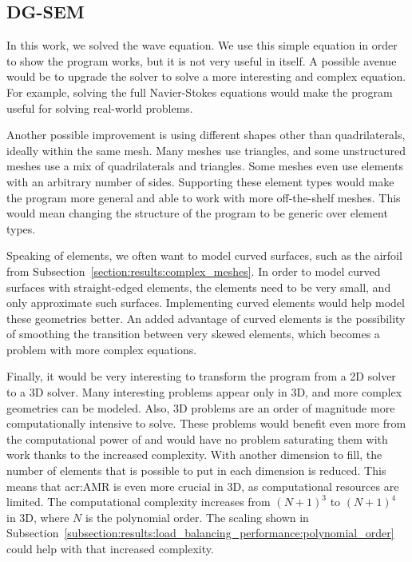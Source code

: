 \subsection{DG-SEM}\label{subsection:conclusion:future_work:dg_sem}

In this work, we solved the wave equation. We use this simple equation in order to show the program
works, but it is not very useful in itself. A possible avenue would be to upgrade the solver to
solve a more interesting and complex equation. For example, solving the full Navier-Stokes equations
would make the program useful for solving real-world problems.

Another possible improvement is using different shapes other than quadrilaterals, ideally within the
same mesh. Many meshes use triangles, and some unstructured meshes use a mix of quadrilaterals and
triangles. Some meshes even use elements with an arbitrary number of sides. Supporting these element
types would make the program more general and able to work with more off-the-shelf meshes. This
would mean changing the structure of the program to be generic over element types.

Speaking of elements, we often want to model curved surfaces, such as the airfoil from
Subsection~\ref{section:results:complex_meshes}. In order to model curved surfaces with
straight-edged elements, the elements need to be very small, and only approximate such surfaces.
Implementing curved elements would help model these geometries better. An added advantage of curved
elements is the possibility of smoothing the transition between very skewed elements, which becomes
a problem with more complex equations.

Finally, it would be very interesting to transform the program from a 2D solver to a 3D solver. Many
interesting problems appear only in 3D, and more complex geometries can be modeled. Also, 3D
problems are an order of magnitude more computationally intensive to solve. These problems would
benefit even more from the computational power of  and would have no problem
saturating them with work thanks to the increased complexity. With another dimension to fill, the
number of elements that is possible to put in each dimension is reduced. This means that
\acrshort{acr:AMR} is even more crucial in 3D, as computational resources are limited. The
computational complexity increases from \({\left( N + 1 \right)}^3\) to \({\left( N + 1 \right)}^4\)
in 3D, where \(N\) is the polynomial order. The scaling shown in
Subsection~\ref{subsection:results:load_balancing_performance:polynomial_order} could help with that
increased complexity.

